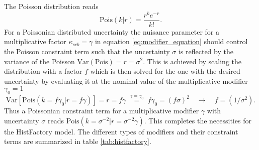 The Poisson distribution reads
\begin{equation}
    \text{Pois}(k|r)= \frac{r^k e^{-r}}{k!}.
\end{equation}
For a Poissonian distributed uncertainty the nuisance parameter for a multiplicative factor $\kappa_{scb}=\gamma$ in equation \ref{eq:modifier_equation} should control the Poisson constraint term such that the uncertainty $\sigma$ is reflected by the variance of the Poisson $\text{Var}(\text{Pois})=r=\sigma^2$. This is achieved by scaling the distribution with a factor $f$ which is then solved for the one with the desired uncertainty by evaluating it at the nominal value of the multiplicative modifier $\gamma_0=1$ 
\begin{equation}
    \mathrm{Var}\left[\mathrm{Pois}(k=f\gamma_0 | r=f\gamma)\right]
    =
    r=f\gamma\;\stackrel{\gamma=\gamma_0}{=}\;f\gamma_0=(f\sigma)^2 
    \quad 
    \rightarrow \quad f=(1/\sigma^2).
\end{equation}
Thus a Poissonian constraint term for a multiplicative modifier $\gamma$ with uncertainty $\sigma$ reads \mbox{$\text{Pois}(k=\sigma^{-2}|r=\sigma^{-2}\gamma)$.} This completes the necessities for the HistFactory model. The different types of modifiers and their constraint terms are summarized in table \ref{tab:histfactory}.
